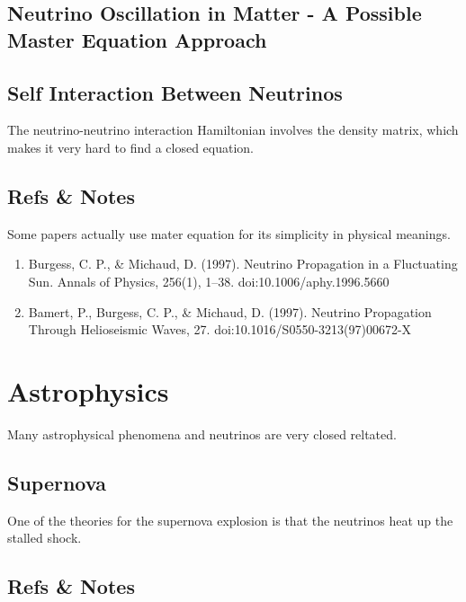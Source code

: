 \documentclass[letterpaper,12pt,english]{sphinxmanual}
\begin{document}
\section{Neutrino Oscillation in Matter - A Possible Master Equation Approach}
\label{mastereqn:neutrino-oscillation-in-matter-a-possible-master-equation-approach}

\section{Self Interaction Between Neutrinos}
\label{mastereqn:self-interaction-between-neutrinos}
The neutrino-neutrino interaction Hamiltonian involves the density matrix, which makes it very hard to find a closed equation.


\section{Refs \& Notes}
\label{mastereqn:refs-notes}
Some papers actually use mater equation for its simplicity in physical meanings.
\begin{enumerate}
\item {} 
Burgess, C. P., \& Michaud, D. (1997). Neutrino Propagation in a Fluctuating Sun. Annals of Physics, 256(1), 1–38. doi:10.1006/aphy.1996.5660

\item {} 
Bamert, P., Burgess, C. P., \& Michaud, D. (1997). Neutrino Propagation Through Helioseismic Waves, 27. doi:10.1016/S0550-3213(97)00672-X

\end{enumerate}


\chapter{Astrophysics}
\label{astrophysics:astrophysics}\label{astrophysics::doc}
Many astrophysical phenomena and neutrinos are very closed reltated.


\section{Supernova}
\label{astrophysics:supernova}
One of the theories for the supernova explosion is that the neutrinos heat up the stalled shock.


\section{Refs \& Notes}
\label{astrophysics:refs-notes}
\end{document}
